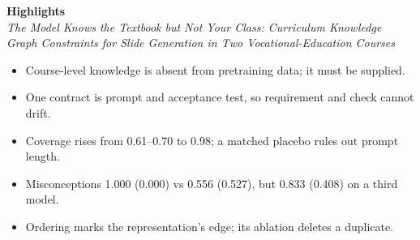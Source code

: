 \documentclass[11pt,a4paper]{article}
\begin{document}
\begin{center}
{\large\bfseries Highlights}\\[2pt]
{\itshape The Model Knows the Textbook but Not Your Class: Curriculum Knowledge
Graph Constraints for Slide Generation in Two Vocational-Education Courses}
\end{center}

\vspace{6pt}

\begin{itemize}[leftmargin=1.4em,itemsep=10pt]
  \item Course-level knowledge is absent from pretraining data; it must be supplied.
  \item One contract is prompt and acceptance test, so requirement and check cannot drift.
  \item Coverage rises from 0.61--0.70 to 0.98; a matched placebo rules out prompt length.
  \item Misconceptions 1.000 (0.000) vs 0.556 (0.527), but 0.833 (0.408) on a third model.
  \item Ordering marks the representation's edge; its ablation deletes a duplicate.
\end{itemize}
\end{document}
